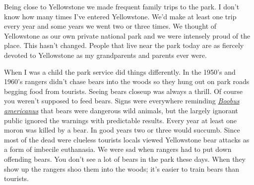 Being close to Yellowstone we made frequent family trips to the park. I
don't know how many times I've entered Yellowstone. We'd make at least
one trip every year and some years we went two or three times. We
thought of Yellowstone as our own private national park and we were
intensely proud of the place. This hasn't changed. People that live near
the park today are as fiercely devoted to Yellowstone as my grandparents
and parents ever were.

When I was a child the park service did things differently. In the
1950's and 1960's rangers didn't chase bears into the woods so they hung
out on park roads begging food from tourists. Seeing bears closeup was
always a thrill. Of course you weren't supposed to feed bears. Signs
were everywhere reminding
\href{http://www.urbandictionary.com/define.php?term=Boobus\%20Americanus}{\emph{Boobus
americanus}} that bears were dangerous wild animals, but the largely
ignorant public ignored the warnings with predictable results. Every
year at least one moron was killed by a bear. In good years two or three
would succumb. Since most of the dead were clueless tourists locals
viewed Yellowstone bear attacks as a form of imbecile euthanasia. We
were sad when rangers had to put down offending bears. You don't see a
lot of bears in the park these days. When they show up the rangers shoo
them into the woods; it's easier to train bears than tourists.




